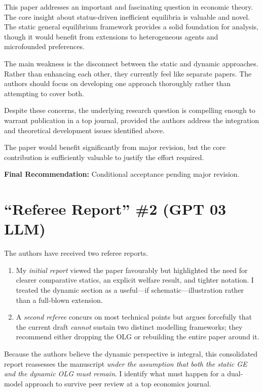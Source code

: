 \documentclass[12pt,letterpaper]{article}
\begin{document}
This paper addresses an important and fascinating question in economic theory. The core insight about status-driven inefficient equilibria is valuable and novel. The static general equilibrium framework provides a solid foundation for analysis, though it would benefit from extensions to heterogeneous agents and microfounded preferences.

The main weakness is the disconnect between the static and dynamic approaches. Rather than enhancing each other, they currently feel like separate papers. The authors should focus on developing one approach thoroughly rather than attempting to cover both.

Despite these concerns, the underlying research question is compelling enough to warrant publication in a top journal, provided the authors address the integration and theoretical development issues identified above.

The paper would benefit significantly from major revision, but the core contribution is sufficiently valuable to justify the effort required.

\textbf{Final Recommendation:} Conditional acceptance pending major revision.



\section{``Referee Report'' \#2 (GPT 03 LLM)}

The authors have received two referee reports.  
\begin{enumerate}
	\item My \emph{initial report} viewed the paper favourably but highlighted the need for clearer comparative statics, an explicit welfare result, and tighter notation.  I treated the dynamic section as a useful---if schematic---illustration rather than a full‐blown extension.
	\item A \emph{second referee} concurs on most technical points but argues forcefully that the current draft \emph{cannot} sustain two distinct modelling frameworks; they recommend either dropping the OLG or rebuilding the entire paper around it.
\end{enumerate}

Because the authors believe the dynamic perspective is integral, this consolidated report reassesses the manuscript \emph{under the assumption that both the static GE and the dynamic OLG must remain}.  I identify what must happen for a dual‐model approach to survive peer review at a top economics journal.
\end{document}
